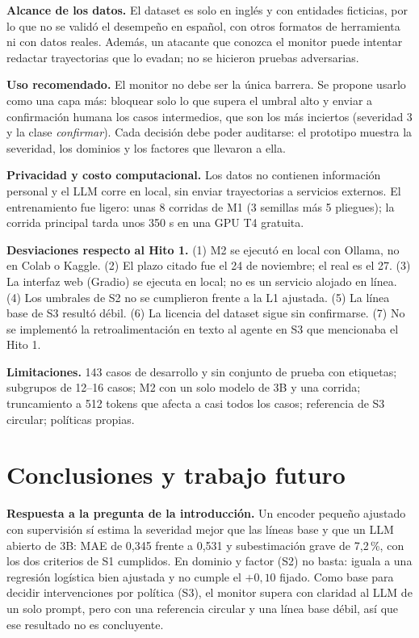 \documentclass[conference]{IEEEtran}
\begin{document}
\textbf{Alcance de los datos.} El dataset es solo en inglés y con entidades ficticias, por lo que no se validó el desempeño en español, con otros formatos de herramienta ni con datos reales. Además, un atacante que conozca el monitor puede intentar redactar trayectorias que lo evadan; no se hicieron pruebas adversarias.

\textbf{Uso recomendado.} El monitor no debe ser la única barrera. Se propone usarlo como una capa más: bloquear solo lo que supera el umbral alto y enviar a confirmación humana los casos intermedios, que son los más inciertos (severidad 3 y la clase \emph{confirmar}). Cada decisión debe poder auditarse: el prototipo muestra la severidad, los dominios y los factores que llevaron a ella.

\textbf{Privacidad y costo computacional.} Los datos no contienen información personal y el LLM corre en local, sin enviar trayectorias a servicios externos. El entrenamiento fue ligero: unas 8 corridas de M1 (3 semillas más 5 pliegues); la corrida principal tarda unos 350 s en una GPU T4 gratuita.

\textbf{Desviaciones respecto al Hito 1.} (1) M2 se ejecutó en local con Ollama, no en Colab o Kaggle. (2) El plazo citado fue el 24 de noviembre; el real es el 27. (3) La interfaz web (Gradio) se ejecuta en local; no es un servicio alojado en línea. (4) Los umbrales de S2 no se cumplieron frente a la L1 ajustada. (5) La línea base de S3 resultó débil. (6) La licencia del dataset sigue sin confirmarse. (7) No se implementó la retroalimentación en texto al agente en S3 que mencionaba el Hito 1.

\textbf{Limitaciones.} 143 casos de desarrollo y sin conjunto de prueba con etiquetas; subgrupos de 12--16 casos; M2 con un solo modelo de 3B y una corrida; truncamiento a 512 tokens que afecta a casi todos los casos; referencia de S3 circular; políticas propias.

\section{Conclusiones y trabajo futuro}
\textbf{Respuesta a la pregunta de la introducción.} Un encoder pequeño ajustado con supervisión sí estima la severidad mejor que las líneas base y que un LLM abierto de 3B: MAE de 0,345 frente a 0,531 y subestimación grave de 7,2\,\%, con los dos criterios de S1 cumplidos. En dominio y factor (S2) no basta: iguala a una regresión logística bien ajustada y no cumple el $+0{,}10$ fijado. Como base para decidir intervenciones por política (S3), el monitor supera con claridad al LLM de un solo prompt, pero con una referencia circular y una línea base débil, así que ese resultado no es concluyente.
\end{document}
